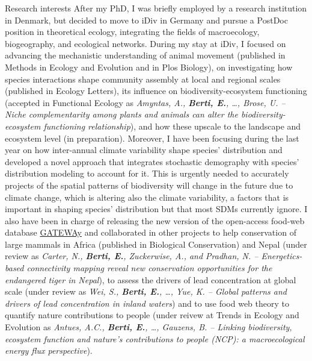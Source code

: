 \documentclass{resume} %
\begin{document}
\begin{rSection}{Research interests}
After my PhD, I was briefly employed by a research institution in Denmark, but decided to move to iDiv in Germany and pursue a PostDoc position in theoretical ecology, integrating the fields of macroecology, biogeography, and ecological networks.
	During my stay at iDiv, I focused on advancing the mechanistic understanding of animal movement (published in Methods in Ecology and Evolution and in Plos Biology), on investigating how species interactions shape community assembly at local and regional scales (published in Ecology Letters), its influence on biodiversity-ecosystem functioning (accepted in Functional Ecology as \textit{Amyntas, A., \textbf{Berti, E.}, \dots, Brose, U. -- Niche complementarity among plants and animals can alter the biodiversity-ecosystem functioning relationship}), and how these upscale to the landscape and ecosystem level (in preparation).
Moreover, I have been focusing during the last year on how inter-annual climate variability shape species' distribution and developed a novel approach that integrates stochastic demography with species' distribution modeling to account for it.
This is urgently needed to accurately projects of the spatial patterns of biodiversity will change in the future due to climate change, which is altering also the climate variability, a factors that is important in shaping species' distribution but that most SDMs currently ignore.
	I also have been in charge of releasing the new version of the open-access food-web database \href{https://idata.idiv.de/ddm/Data/ShowData/283?version=3}{GATEWAy} and collaborated in other projects to help conservation of large mammals in Africa (published in Biological Conservation) and Nepal (under review as \textit{Carter, N., \textbf{Berti, E.}, Zuckerwise, A., and Pradhan, N. -- Energetics-based connectivity mapping reveal new conservation opportunities for the endangered tiger in Nepal}), to assess the drivers of lead concentration at global scale (under review as \textit{Wei, S., \textbf{Berti, E.}, \dots, Yue, K. -- Global patterns and drivers of lead concentration in inland waters}) and to use food web theory to quantify nature contributions to people (under reivew at Trends in Ecology and Evolution as \textit{Antues, A.C., \textbf{Berti, E.}, \dots, Gauzens, B. -- Linking biodiversity, ecosystem function and nature’s contributions to people (NCP): a macroecological energy flux perspective}).
\end{rSection}
\end{document}
